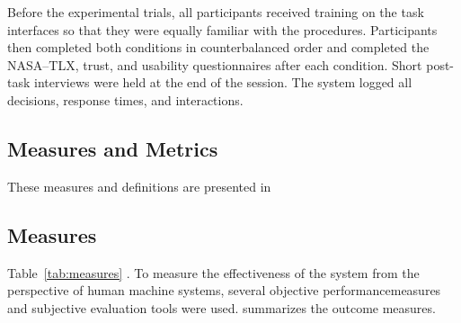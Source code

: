 \documentclass[journal]{IEEEtran}
\theoremstyle{plain}
\theoremstyle{definition}
\providecommand{\DIFaddtex}[1]{{\protect\color{blue} \sf #1}} %
\providecommand{\DIFdeltex}[1]{{\protect\color{red} \scriptsize #1}} %
\providecommand{\DIFaddbegin}{} %
\providecommand{\DIFaddend}{} %
\providecommand{\DIFdelbegin}{} %
\providecommand{\DIFdelend}{} %
\providecommand{\DIFadd}[1]{\texorpdfstring{\DIFaddtex{#1}}{#1}} %
\providecommand{\DIFdel}[1]{\texorpdfstring{\DIFdeltex{#1}}{}} %
\newcommand{\DIFscaledelfig}{0.5}
\newlength{\DIFdelgraphicswidth} %
\newlength{\DIFdelgraphicsheight} %
\newcommand{\DIFaddincludegraphics}[2][]{{\color{blue}\fbox{\DIFOincludegraphics[#1]{#2}}}} %
\newcommand{\DIFdelincludegraphics}[2][]{%
\sbox{\DIFdelgraphicsbox}{\DIFOincludegraphics[#1]{#2}}%
\settoboxwidth{\DIFdelgraphicswidth}{\DIFdelgraphicsbox} %
\settoboxtotalheight{\DIFdelgraphicsheight}{\DIFdelgraphicsbox} %
\scalebox{\DIFscaledelfig}{%
\parbox[b]{\DIFdelgraphicswidth}{\usebox{\DIFdelgraphicsbox}\\[-\baselineskip] \rule{\DIFdelgraphicswidth}{0em}}\llap{\resizebox{\DIFdelgraphicswidth}{\DIFdelgraphicsheight}{%
\setlength{\unitlength}{\DIFdelgraphicswidth}%
\begin{picture}(1,1)%
\thicklines\linethickness{2pt} %
{\color[rgb]{1,0,0}\put(0,0){\framebox(1,1){}}}%
{\color[rgb]{1,0,0}\put(0,0){\line( 1,1){1}}}%
{\color[rgb]{1,0,0}\put(0,1){\line(1,-1){1}}}%
\end{picture}%
}\hspace*{3pt}}} %
} %
\DeclareRobustCommand{\DIFaddbegin}{\DIFOaddbegin \let\includegraphics\DIFaddincludegraphics} %
\DeclareRobustCommand{\DIFaddend}{\DIFOaddend \let\includegraphics\DIFOincludegraphics} %
\DeclareRobustCommand{\DIFdelbegin}{\DIFOdelbegin \let\includegraphics\DIFdelincludegraphics} %
\DeclareRobustCommand{\DIFdelend}{\DIFOaddend \let\includegraphics\DIFOincludegraphics} %
\begin{document}
    \DIFdelbegin %
\DIFdelend \DIFaddbegin \DIFadd{Before the experimental trials, all participants received training on the task interfaces so that they were equally familiar with the procedures. Participants then completed both conditions in counterbalanced order and completed the NASA--TLX, trust, and usability questionnaires after each condition. Short post-task interviews were held at the end of the session. The system logged all decisions, response times, and interactions.
}\DIFaddend 

    \DIFdelbegin \subsection{\DIFdel{Measures and Metrics}}
\addtocounter{subsection}{-1}%
\DIFdel{These measures and definitions are presented in }\DIFdelend \DIFaddbegin \subsection{\DIFadd{Measures}}
    \label{sec:measures}
    \DIFaddend Table~\ref{tab:measures} \DIFdelbegin \DIFdel{.
    To measure the effectiveness of the system from the perspective of human machine systems, several objective performancemeasures and subjective evaluation tools were used. }\DIFdelend \DIFaddbegin \DIFadd{summarizes the outcome measures.
}
\end{document}
